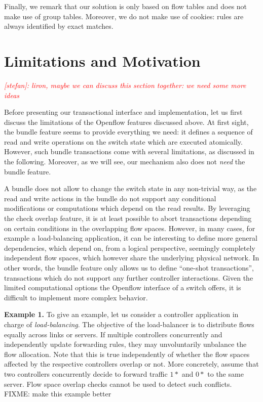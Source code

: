 \documentclass[conference]{sigcomm-alternate}
\newcommand{\stefan}[1]{\textit{\textcolor{red}{[stefan]: #1}}} %
\begin{document}
Finally, we remark that our solution is only based on flow tables
and does not make use
of group tables. 
Moreover, we do not make use of cookies: rules
are always identified by exact matches.

\section{Limitations and Motivation}\label{sec:motivation}

\stefan{liron, maybe we can discuss this section together: we need some more ideas}

Before presenting our transactional interface and implementation,
let us first discuss the limitations of the Openflow features discussed above.
At first sight, the bundle feature seems to provide everything
we need: it defines a sequence of read and write operations
 on the switch state which are executed atomically.
 However, such bundle transactions come with several
 limitations, as discussed in the following. Moreover,
 as we will see, our mechanism also does not \emph{need}
 the bundle feature. 

A bundle does not allow
 to change the switch state in any non-trivial way,
 as the read and write actions in the bundle do
 not support any conditional modifications or computations which
 depend on the read results. By leveraging
 the check overlap feature, it is at least possible
 to abort transactions depending on certain conditions
 in the overlapping
 flow spaces. However, in many cases, for example
 a load-balancing application,
 it can be interesting to define more general
 dependencies, which depend on, from a logical perspective,
 seemingly
 completely independent flow spaces,
 which however share the underlying physical network.
In other words, the bundle feature only allows us to
define ``one-shot transactions'',
transactions which do not support any further controller interactions.
Given
the limited computational options the Openflow interface of a switch offers,
it is difficult to implement more complex behavior.

\textbf{Example 1.} To give an example, let us consider a controller application in charge
of \emph{load-balancing}. The objective of the load-balancer
is to distribute flows equally across links or servers.
If multiple controllers concurrently and independently
update forwarding rules, they may unvoluntarily
unbalance the flow allocation. Note that this
is true independently of whether the flow spaces
affected by the respective controllers overlap or not.
More concretely, assume that two controllers concurrently
decide to forward traffic $1*$ and $0*$ to the same server.
Flow space overlap checks cannot be used to detect
such conflicts.
FIXME: make this example better
\end{document}
